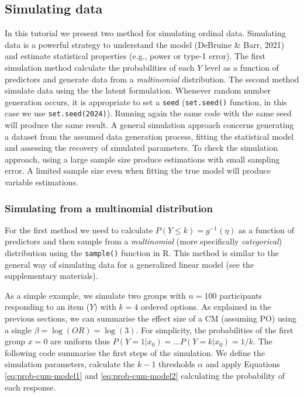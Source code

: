 \documentclass[
  man,floatsintext]{apa6}
\begin{document}
\normalsize

\subsection{Simulating data}\label{simulating-data}

In this tutorial we present two method for simulating ordinal data. Simulating data is a powerful strategy to understand the model (DeBruine \& Barr, 2021) and estimate statistical properties (e.g., power or type-1 error). The first simulation method calculate the probabilities of each \(Y\) level as a function of predictors and generate data from a \emph{multinomial} distribution. The second method simulate data using the the latent formulation. Whenever random number generation occurs, it is appropriate to set a \texttt{seed} (\texttt{set.seed()} function, in this case we use \texttt{set.seed(2024)}). Running again the same code with the same seed will produce the same result. A general simulation approach concerns generating a dataset from the assumed data generation process, fitting the statistical model and assessing the recovery of simulated parameters. To check the simulation approach, using a large sample size produce estimations with small sampling error. A limited sample size even when fitting the true model will produce variable estimations.

\subsubsection{Simulating from a multinomial distribution}\label{simulating-from-a-multinomial-distribution}

For the first method we need to calculate \(P(Y \leq k) = g^{-1}(\eta)\) as a function of predictors and then sample from a \emph{multinomial} (more specifically \emph{categorical}) distribution using the \texttt{sample()} function in R. This method is similar to the general way of simulating data for a generalized linear model (see the supplementary materials).

As a simple example, we simulate two groups with \(n = 100\) participants responding to an item (\(Y\)) with \(k = 4\) ordered options. As explained in the previous sections, we can summarise the effect size of a CM (assuming PO) using a single \(\beta = \log(OR) = \log(3)\). For simplicity, the probabilities of the first group \(x = 0\) are uniform thus \(P(Y = 1|x_0) = \dots P(Y = k|x_0) = 1/k\). The following code summarise the first steps of the simulation. We define the simulation parameters, calculate the \(k - 1\) thresholds \(\alpha\) and apply Equations \eqref{eq:prob-cum-model1} and \eqref{eq:prob-cum-model2} calculating the probability of each response.
\end{document}
